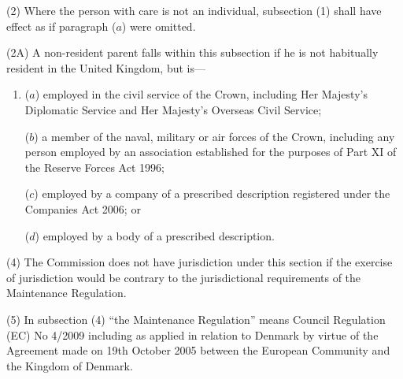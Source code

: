 \documentclass[12pt,a4paper]{article}
\begin{document}
(2) Where the person with care is not an individual, subsection (1) shall have effect as if paragraph ($a$) were omitted.

(2A) A non-resident parent falls within this subsection if he is not habitually resident in the United Kingdom, but is---
\begin{enumerate}\item[]
($a$) employed in the civil service of the Crown, including Her Majesty’s
Diplomatic Service and Her Majesty’s Overseas Civil Service;

($b$) a member of the naval, military or air forces of the Crown, including any
person employed by an association established for the purposes of Part XI of
the Reserve Forces Act 1996;

($c$) employed by a company of a prescribed description registered under the
Companies Act 2006; or

($d$) employed by a body of a prescribed description.
\end{enumerate}


(4) The Commission does not have jurisdiction under this section if the exercise of jurisdiction would be contrary to the jurisdictional requirements of the Maintenance Regulation.

(5) In subsection (4) “the Maintenance Regulation” means Council Regulation (EC) No 4/2009 including as applied in relation to Denmark by virtue of the Agreement made on 19th October 2005 between the European Community and the Kingdom of Denmark.
\end{document}
